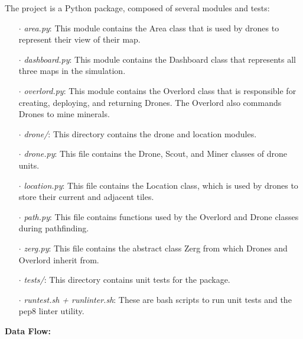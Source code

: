 \documentclass{article}
\begin{document}
The project is a Python package, composed of several modules and tests:
\begin{itemize}
	\item [$\cdot$] \textit{area.py}: This module contains the Area class
	that is used by drones to represent their view of their map.
	\item [$\cdot$] \textit{dashboard.py}: This module contains the
	Dashboard class that represents all three maps in the simulation.
	\item [$\cdot$] \textit{overlord.py}: This module contains the
	Overlord class that is responsible for creating, deploying, and 
	returning Drones. The Overlord also commands Drones to mine minerals.
	\item [$\cdot$] \textit{drone/}: This directory contains the drone and 
	location modules.
	\item [$\cdot$] \textit{drone.py}: This file contains the Drone, Scout,
	and Miner classes of drone units. 
	\item [$\cdot$] \textit{location.py}: This file contains the Location
	class, which is used by drones to store their current and adjacent 
	tiles.
	\item [$\cdot$] \textit{path.py}: This file contains functions used by
	the Overlord and Drone classes during pathfinding.
	\item [$\cdot$] \textit{zerg.py}: This file contains the abstract class
	Zerg from which Drones and Overlord inherit from.
	\item [$\cdot$] \textit{tests/}: This directory contains unit tests for
	the package.
	\item [$\cdot$] \textit{runtest.sh + runlinter.sh}: These are bash
	scripts to run unit tests and the pep8 linter utility.
\end{itemize}
\vspace{5mm}

\begin{flushleft}
\textbf{Data Flow:}
\vspace{.5pc}
\end{flushleft}

\vspace{5mm}
\end{document}

